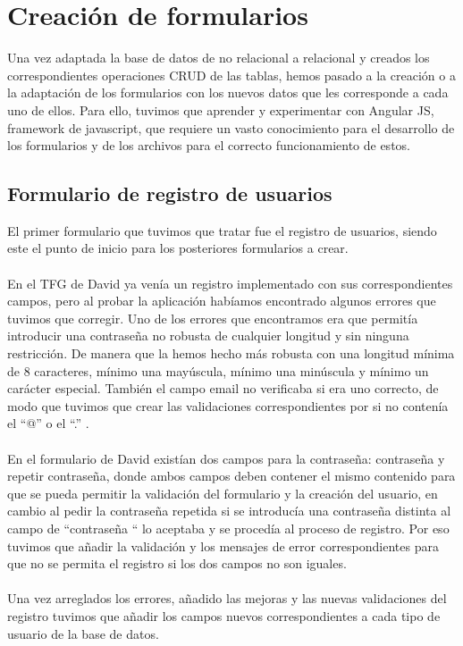\documentclass[11pt]{article}
\begin{document}
\section{Creación de formularios}
Una vez adaptada la base de datos de no relacional a relacional y creados los correspondientes operaciones CRUD de las tablas, hemos pasado a la creación o a la adaptación de los formularios con los nuevos datos que les corresponde a cada uno de ellos. Para ello, tuvimos que aprender y experimentar con Angular JS, framework de javascript, que requiere un vasto conocimiento para el desarrollo de los formularios y de los archivos para el correcto funcionamiento de estos. 
\subsection{Formulario de registro de usuarios}
El primer formulario que tuvimos que tratar fue el registro de usuarios, siendo este el punto de inicio para los posteriores formularios a crear.\\\\
En el TFG de David ya venía un registro implementado con sus correspondientes campos, pero al probar la aplicación habíamos encontrado algunos errores que tuvimos que corregir. Uno de los errores que encontramos era que permitía introducir una contraseña no robusta de cualquier longitud y sin ninguna restricción. De manera que la hemos hecho más robusta con una longitud mínima de 8 caracteres, mínimo una mayúscula, mínimo una minúscula y mínimo un carácter especial. También el campo email no verificaba si era uno  correcto, de modo que tuvimos que crear las validaciones correspondientes por si no contenía el “@” o el “.” .\\\\
En el formulario de David existían dos campos para la contraseña: contraseña y repetir contraseña, donde ambos campos deben contener el mismo contenido para que se pueda permitir la validación del formulario y la creación del usuario, en cambio al pedir la contraseña repetida si se introducía una contraseña distinta al campo de “contraseña “ lo aceptaba y se procedía al proceso de registro. Por eso tuvimos que añadir la validación y los mensajes de error correspondientes para que no se permita el registro si los dos campos no son iguales.\\\\
Una vez arreglados los errores, añadido las mejoras y las nuevas validaciones del registro tuvimos que añadir los campos nuevos correspondientes a cada tipo de usuario de la base de datos. \\\\
\end{document}
